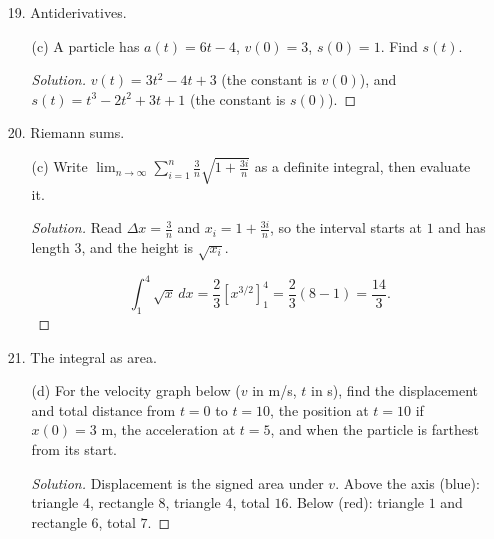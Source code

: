 \documentclass[12pt]{article}
\newcommand\brac[1]{\left[ #1 \right]}
\newenvironment{solution}
  {\renewcommand\qedsymbol{$\blacksquare$}\begin{proof}[Solution]}
  {\end{proof}}
\begin{document}
\begin{enumerate}
\begin{enumerate}
\begin{solution}
$S' = 0$ gives $r^3 = 8$, so $r = 2$ cm and $h = 4$ cm. $S'' > 0$ for $r>0$, so this is a min. The best can has height equal to its diameter.
\end{solution}
\end{enumerate}
\item[19.] Antiderivatives.
\begin{enumerate}
\item[(c)] A particle has $a(t) = 6t - 4$, $v(0) = 3$, $s(0) = 1$. Find $s(t)$.
\begin{solution}
$v(t) = 3t^2 - 4t + 3$ (the constant is $v(0)$), and $s(t) = t^3 - 2t^2 + 3t + 1$ (the constant is $s(0)$).
\end{solution}
\end{enumerate}
\item[20.] Riemann sums.
\begin{enumerate}
\item[(c)] Write $\lim_{n \to \infty} \sum_{i=1}^n \frac{3}{n}\sqrt{1 + \frac{3i}{n}}$ as a definite integral, then evaluate it.
\begin{solution}
Read $\Delta x = \frac3n$ and $x_i = 1 + \frac{3i}{n}$, so the interval starts at $1$ and has length $3$, and the height is $\sqrt{x_i}$.

\[\int_1^4 \sqrt{x}\,dx = \frac23\brac{x^{3/2}}_1^4 = \frac23(8-1) = \frac{14}{3}.\]
\end{solution}
\end{enumerate}
\item[21.] The integral as area.
\begin{enumerate}
\item[(d)] For the velocity graph below ($v$ in m/s, $t$ in s), find the displacement and total distance from $t=0$ to $t=10$, the position at $t=10$ if $x(0)=3$ m, the acceleration at $t=5$, and when the particle is farthest from its start.
\begin{center}
\end{center}
\begin{solution}
Displacement is the signed area under $v$. Above the axis (blue): triangle $4$, rectangle $8$, triangle $4$, total $16$. Below (red): triangle $1$ and rectangle $6$, total $7$.


\end{solution}
\end{enumerate}
\end{enumerate}
\end{document}
